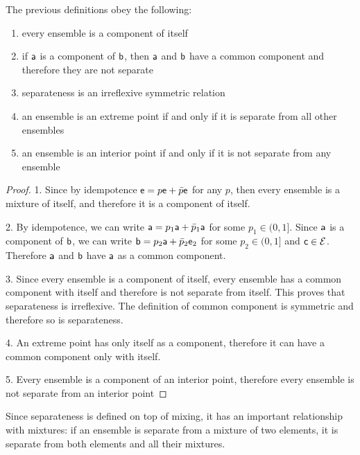 \begin{mathSection}
\begin{coro}
	The previous definitions obey the following:
	\begin{enumerate}
		\item every ensemble is a component of itself
		\item if $\ens[a]$ is a component of $\ens[b]$, then $\ens[a]$ and $\ens[b]$ have a common component and therefore they are not separate
		\item separateness is an irreflexive symmetric relation
		\item an ensemble is an extreme point if and only if it is separate from all other ensembles
		\item an ensemble is an interior point if and only if it is not separate from any ensemble
	\end{enumerate}
\end{coro}

\begin{proof}
	1. Since by idempotence $\ens = p \ens + \bar{p} \ens$ for any $p$, then every ensemble is a mixture of itself, and therefore it is a component of itself.
	
	2. By idempotence, we can write $\ens[a] = p_1 \ens[a] + \bar{p}_1 \ens[a]$ for some $p_1 \in (0,1]$. Since $\ens[a]$ is a component of $\ens[b]$, we can write $\ens[b] = p_2 \ens[a] + \bar{p}_2 \ens[e]_2$ for some $p_2 \in (0, 1]$ and $\ens[c] \in \Ens$. Therefore $\ens[a]$ and $\ens[b]$ have $\ens[a]$ as a common component.
	
	3. Since every ensemble is a component of itself, every ensemble has a common component with itself and therefore is not separate from itself. This proves that separateness is irreflexive. The definition of common component is symmetric and therefore so is separateness.
	
	4. An extreme point has only itself as a component, therefore it can have a common component only with itself.
	
	5. Every ensemble is a component of an interior point, therefore every ensemble is not separate from an interior point
\end{proof}
\end{mathSection}

Since separateness is defined on top of mixing, it has an important relationship with mixtures: if an ensemble is separate from a mixture of two elements, it is separate from both elements and all their mixtures.

